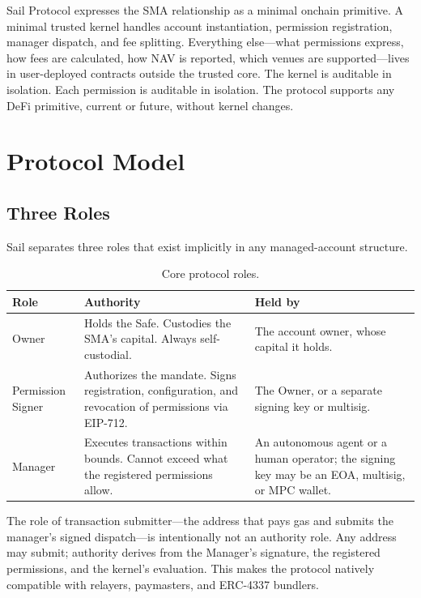 \documentclass[11pt]{article}
\begin{document}
Sail Protocol expresses the SMA relationship as a minimal onchain primitive. A minimal trusted kernel handles account instantiation, permission registration, manager dispatch, and fee splitting. Everything else---what permissions express, how fees are calculated, how NAV is reported, which venues are supported---lives in user-deployed contracts outside the trusted core. The kernel is auditable in isolation. Each permission is auditable in isolation. The protocol supports any DeFi primitive, current or future, without kernel changes.

\section{Protocol Model}

\subsection{Three Roles}

Sail separates three roles that exist implicitly in any managed-account structure.

\begin{table}[h]
\small
\centering
\begin{tabular}{@{}p{}p{}p{}@{}}
\toprule
\textbf{Role} & \textbf{Authority} & \textbf{Held by} \\
\midrule
Owner & Holds the Safe. Custodies the SMA's capital. Always self-custodial. & The account owner, whose capital it holds. \\
\addlinespace[2pt]
Permission Signer & Authorizes the mandate. Signs registration, configuration, and revocation of permissions via EIP-712. & The Owner, or a separate signing key or multisig. \\
\addlinespace[2pt]
Manager & Executes transactions within bounds. Cannot exceed what the registered permissions allow. & An autonomous agent or a human operator; the signing key may be an EOA, multisig, or MPC wallet. \\
\bottomrule
\end{tabular}
\caption{Core protocol roles.}
\end{table}

The role of transaction submitter---the address that pays gas and submits the manager's signed dispatch---is intentionally not an authority role. Any address may submit; authority derives from the Manager's signature, the registered permissions, and the kernel's evaluation. This makes the protocol natively compatible with relayers, paymasters, and ERC-4337 bundlers.
\end{document}
